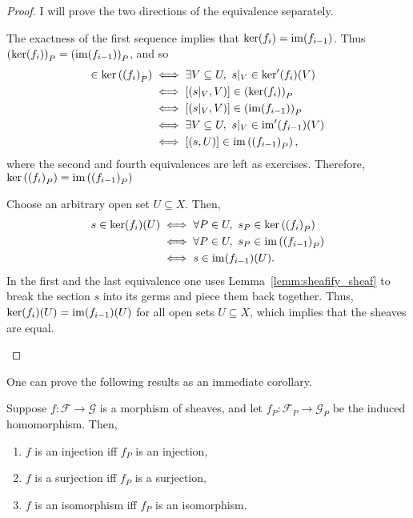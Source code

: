 \begin{proof}
  I will prove the two directions of the equivalence separately.
  \begin{description}[style=nextline]
    \item[$\Longrightarrow\big)$]
          The exactness of the first sequence implies
          that $\ker(f_{i})=\operatorname{im}(f_{i-1})$. Thus $\left(\ker(f_{i})\right)_{P}
          =\left(\operatorname{im}(f_{i-1})\right)_{P}$, and so
          \begin{align*}
            [(s, U)]\in\ker\left(\left(f_{i}\right)_{P}\right)
            &\iff \exists V\subseteq U,\ s\vert_{V}\in\ker^{\prime}(f_{i})(V)\\
            &\iff [(s\vert_{V},V)]\in\left(\ker(f_{i})\right)_{P} \\
            &\iff [(s\vert_{V},V)]\in\left(\im(f_{i-1})\right)_{P} \\
            &\iff \exists V\subseteq U,\ s\vert_{V}\in
              \im^{\prime}(f_{i-1})(V) \\
            &\iff [(s,U)]\in\im\left(\left(f_{i-1}\right)_{P}\right),
          \end{align*}
          where the second and fourth equivalences are left as exercises.
          Therefore, $\ker\left(\left(f_{i}\right)_{P}\right)
          =\operatorname{im}\left(\left(f_{i-1}\right)_{P}\right)$
    \item[$\Longleftarrow\big)$]
          Choose an arbitrary open set $U\subseteq X$. Then,
          \begin{align*}
            s\in\ker(f_{i})(U)
            &\iff \forall P\in U,\ s_{P}\in\ker\left(\left(
              f_{i}\right)_{P}\right) \\
            &\iff \forall P\in U,\ s_{P}\in\operatorname{im}\left(\left(
              f_{i-1}\right)_{P}\right) \\
            &\iff s\in\operatorname{im}(f_{i-1})(U).
          \end{align*}
          In the first and the last equivalence one uses
          Lemma~\ref{lemm:sheafify_sheaf} to break the section $s$ into
          its germs and piece them back together. Thus,
          $\ker(f_{i})(U)=\operatorname{im}(f_{i-1})(U)$ for all open sets
          $U\subseteq X$, which implies that the sheaves are equal.
  \end{description}
\end{proof}
One can prove the following results as an immediate corollary.
\begin{cor}
  Suppose $f:\mathscr{F}\to\mathscr{G}$ is a morphism of sheaves, and
  let $f_{P}:\mathscr{F}_{P}\to\mathscr{G}_{P}$ be the induced homomorphism.
  Then,
  \begin{enumerate}
    \item $f$ is an injection iff $f_{P}$ is an injection,
    \item $f$ is a surjection iff $f_{P}$ is a surjection,
    \item $f$ is an isomorphism iff $f_{P}$ is an isomorphism.
  \end{enumerate}
\end{cor}
